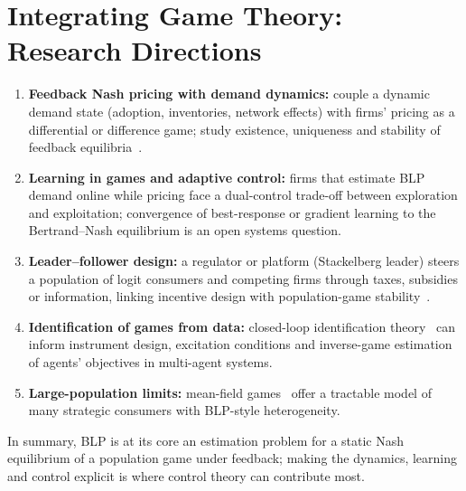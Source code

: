 \documentclass[10pt,a4paper]{article}
\begin{document}
\section{Integrating Game Theory: Research Directions}
\begin{enumerate}
\item \textbf{Feedback Nash pricing with demand dynamics:} couple a dynamic
demand state (adoption, inventories, network effects) with firms' pricing as a
differential or difference game; study existence, uniqueness and stability of
feedback equilibria~\cite{BasarOlsder1999,EricsonPakes1995}.
\item \textbf{Learning in games and adaptive control:} firms that estimate BLP
demand online while pricing face a dual-control trade-off between exploration
and exploitation; convergence of best-response or gradient learning to the
Bertrand--Nash equilibrium is an open systems question.
\item \textbf{Leader--follower design:} a regulator or platform (Stackelberg
leader) steers a population of logit consumers and competing firms through
taxes, subsidies or information, linking incentive design with population-game
stability~\cite{Sandholm2010}.
\item \textbf{Identification of games from data:} closed-loop identification
theory~\cite{Ljung1999} can inform instrument design, excitation conditions and
inverse-game estimation of agents' objectives in multi-agent systems.
\item \textbf{Large-population limits:} mean-field games~\cite{HuangMalhameCaines2006}
offer a tractable model of many strategic consumers with BLP-style heterogeneity.
\end{enumerate}
In summary, BLP is at its core an estimation problem for a static Nash
equilibrium of a population game under feedback; making the dynamics,
learning and control explicit is where control theory can contribute most.


{\small}
\end{document}
